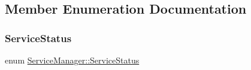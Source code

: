 \subsection{Member Enumeration Documentation}
\mbox{\label{classServiceManager_af3f2b1502eece536d0e4c8d3f2fa439d}} 
\subsubsection{\texorpdfstring{Service\+Status}{ServiceStatus}}
{\footnotesize\ttfamily enum \hyperlink{classServiceManager_af3f2b1502eece536d0e4c8d3f2fa439d}{Service\+Manager\+::\+Service\+Status}}

